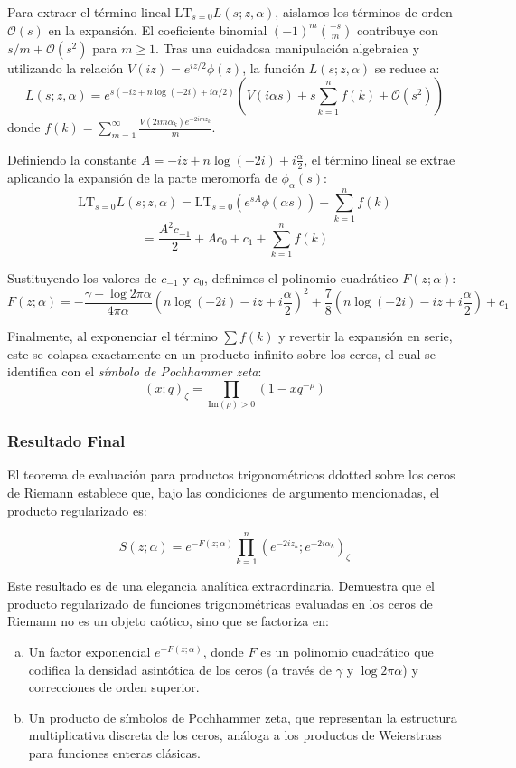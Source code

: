 Para extraer el término lineal $\text{LT}_{s=0} L(s; z, \alpha)$, aislamos los términos de orden $\mathcal{O}(s)$ en la expansión. El coeficiente binomial $(-1)^m \binom{-s}{m}$ contribuye con $s/m + \mathcal{O}(s^2)$ para $m \ge 1$. Tras una cuidadosa manipulación algebraica y utilizando la relación $V(iz) = e^{iz/2}\phi(z)$, la función $L(s; z, \alpha)$ se reduce a:
$$ L(s; z, \alpha) = e^{s(-iz + n \log(-2i) + i\alpha/2)} \left( V(i\alpha s) + s \sum_{k=1}^n f(k) + \mathcal{O}(s^2) \right) $$
donde $f(k) = \sum_{m=1}^\infty \frac{V(2im\alpha_k) e^{-2imz_k}}{m}$.

Definiendo la constante $A = -iz + n \log(-2i) + i\frac{\alpha}{2}$, el término lineal se extrae aplicando la expansión de la parte meromorfa de $\phi_\alpha(s)$:
$$ \text{LT}_{s=0} L(s; z, \alpha) = \text{LT}_{s=0} \left( e^{sA} \phi(\alpha s) \right) + \sum_{k=1}^n f(k) $$
$$ = \frac{A^2 c_{-1}}{2} + A c_0 + c_1 + \sum_{k=1}^n f(k) $$

Sustituyendo los valores de $c_{-1}$ y $c_0$, definimos el polinomio cuadrático $F(z; \alpha)$:
$$ F(z; \alpha) = -\frac{\gamma + \log 2\pi\alpha}{4\pi\alpha} \left( n \log(-2i) - iz + i\frac{\alpha}{2} \right)^2 + \frac{7}{8} \left( n \log(-2i) - iz + i\frac{\alpha}{2} \right) + c_1 $$

Finalmente, al exponenciar el término $\sum f(k)$ y revertir la expansión en serie, este se colapsa exactamente en un producto infinito sobre los ceros, el cual se identifica con el \textit{símbolo de Pochhammer zeta}:
$$ (x; q)_\zeta = \prod_{\text{Im}(\rho)>0} (1 - x q^{-\rho}) $$

\subsubsection*{Resultado Final}

El teorema de evaluación para productos trigonométricos ddotted sobre los ceros de Riemann establece que, bajo las condiciones de argumento mencionadas, el producto regularizado es:

$$ S(z; \alpha) = e^{-F(z; \alpha)} \prod_{k=1}^n (e^{-2iz_k}; e^{-2i\alpha_k})_\zeta $$

Este resultado es de una elegancia analítica extraordinaria. Demuestra que el producto regularizado de funciones trigonométricas evaluadas en los ceros de Riemann no es un objeto caótico, sino que se factoriza en:
\begin{enumerate}[a)]
    \item Un factor exponencial $e^{-F(z; \alpha)}$, donde $F$ es un polinomio cuadrático que codifica la densidad asintótica de los ceros (a través de $\gamma$ y $\log 2\pi\alpha$) y correcciones de orden superior.
    \item Un producto de símbolos de Pochhammer zeta, que representan la estructura multiplicativa discreta de los ceros, análoga a los productos de Weierstrass para funciones enteras clásicas.
\end{enumerate}

